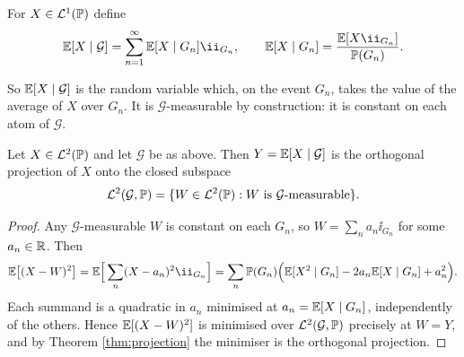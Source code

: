 \documentclass[a4paper]{scrartcl}
\newcommand{\cG}{\mathcal{G}}
\newcommand{\cL}{\mathcal{L}}
\newcommand{\ind}{\ii}
\begin{document}
\begin{definition}
	For $X \in \cL^1(\PP)$ define
	$$
	\EE[X \mid \cG] = \sum_{n=1}^\infty \EE[X\mid G_n]\ind_{G_n}, \qquad \EE[X\mid G_n] = \frac{\EE[X\ind_{G_n}]}{\PP(G_n)}.
	$$
\end{definition}

So $\EE[X\mid\cG]$ is the random variable which, on the event $G_n$, takes the value of the average of $X$ over $G_n$. It is $\cG$-measurable by construction: it is constant on each atom of $\cG$.

\begin{proposition}\label{prop:cond-exp-proj}
	Let $X \in \cL^2(\PP)$ and let $\cG$ be as above. Then $Y = \EE[X\mid\cG]$ is the orthogonal projection of $X$ onto the closed subspace
	$$
	\cL^2(\cG,\PP) = \{ W \in \cL^2(\PP) : W \text{ is } \cG\text{-measurable}\}.
	$$
\end{proposition}
\begin{proof}
	Any $\cG$-measurable $W$ is constant on each $G_n$, so $W = \sum_n a_n \ind_{G_n}$ for some $a_n \in \mathbb{R}$. Then
	$$
	\EE\big[(X-W)^2\big] = \EE\Big[\sum_n (X-a_n)^2\ind_{G_n}\Big] = \sum_n \PP(G_n)\Big( \EE[X^2\mid G_n] - 2a_n\EE[X\mid G_n]+a_n^2\Big).
	$$
	Each summand is a quadratic in $a_n$ minimised at $a_n = \mathbb{E}[X\mid G_n]$, independently of the others. Hence $\mathbb{E}[(X-W)^2]$ is minimised over $\cL^2(\cG,\PP)$ precisely at $W = Y$, and by Theorem \ref{thm:projection} the minimiser is the orthogonal projection.
\end{proof}

\begin{center}
\end{center}
\end{document}
